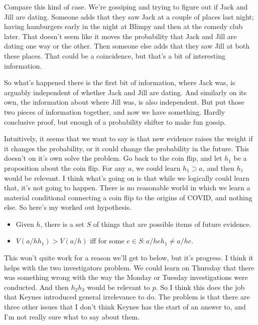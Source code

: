 \documentclass[
  11pt,
  letterpaper,
  DIV=11,
  numbers=noendperiod,
  oneside]{scrartcl}
\providecommand{\tightlist}{%
  \setlength{\itemsep}{0pt}\setlength{\parskip}{0pt}}\usepackage{longtable,booktabs,array}
\begin{document}
Compare this kind of case. We're gossiping and trying to figure out if
Jack and Jill are dating. Someone adds that they saw Jack at a couple of
places last night; having hamburgers early in the night at Blimpy and
then at the comedy club later. That doesn't seem like it moves the
probability that Jack and Jill are dating one way or the other. Then
someone else adds that they saw Jill at both these places. That could be
a coincidence, but that's a bit of interesting information.

So what's happened there is the first bit of information, where Jack
was, is arguably independent of whether Jack and Jill are dating. And
similarly on its own, the information about where Jill was, is also
independent. But put those two pieces of information together, and now
we have something. Hardly conclusive proof, but enough of a probability
shifter to make fun gossip.

Intuitively, it seems that we want to say is that new evidence raises
the weight if it changes the probability, or it could change the
probability in the future. This doesn't on it's own solve the problem.
Go back to the coin flip, and let \(h_1\) be a proposition about the
coin flip. For any \(a\), we could learn \(h_1 \supset a\), and then
\(h_1\) would be relevant. I think what's going on is that while we
logically could learn that, it's not going to happen. There is no
reasonable world in which we learn a material conditional connecting a
coin flip to the origins of COVID, and nothing else. So here's my worked
out hypothesis.

\begin{itemize}
\tightlist
\item
  Given \(h\), there is a set \(S\) of things that are possible items of
  future evidence.
\item
  \(V(a/hh_1) > V(a/h)\) iff for some \(e \in S: a/heh_1 \neq a/he\).
\end{itemize}

This won't quite work for a reason we'll get to below, but it's
progress. I think it helps with the two investigators problem. We could
learn on Thursday that there was something wrong with the way the Monday
or Tuesday investigations were conducted. And then \(h_2h_3\) would be
relevant to \(p\). So I think this does the job that Keynes introduced
general irrelevance to do. The problem is that there are three other
issues that I don't think Keynes has the start of an answer to, and I'm
not really sure what to say about them.
\end{document}
